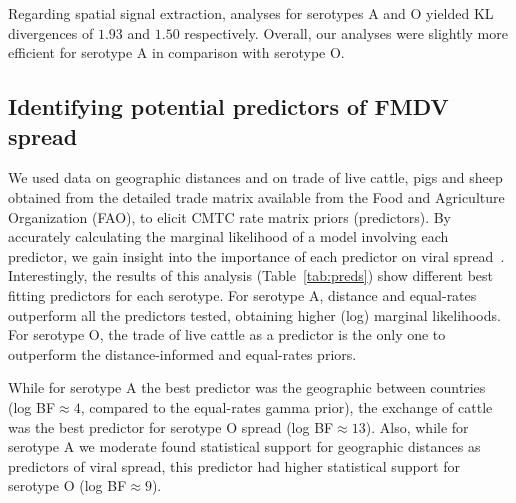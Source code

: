 \documentclass[10pt]{article}
\begin{document}
Regarding spatial signal extraction, analyses for serotypes  A and O yielded KL divergences of $1.93$ and $1.50$ respectively.
Overall, our analyses were slightly more efficient for serotype A in comparison with serotype O.

\subsection*{Identifying potential predictors of FMDV spread}

We used data on geographic distances and on trade of live cattle, pigs and sheep obtained from the detailed trade matrix available from the Food and Agriculture Organization (FAO), to elicit CMTC rate matrix priors (predictors).
By accurately calculating the marginal likelihood of a model involving each predictor, we gain insight into the importance of each predictor on viral spread~\cite{Carvalho2013,Nelson2011}.
%
Interestingly, the results of this analysis (Table~\ref{tab:preds}) show different best fitting predictors for each serotype.
For serotype A, distance and equal-rates outperform all the predictors tested, obtaining higher (log) marginal likelihoods.
For serotype O, the trade of live cattle as a predictor is the only one to outperform the distance-informed and equal-rates  priors.

While for serotype A the best predictor was the geographic between countries (log BF$\approx 4$, compared to the equal-rates gamma prior), the exchange of cattle was the best predictor for serotype O spread (log BF$\approx 13$).
Also, while for serotype A we moderate found statistical support for geographic distances as predictors of viral spread, this predictor had higher statistical support for serotype O (log BF$\approx 9$).
\end{document}

